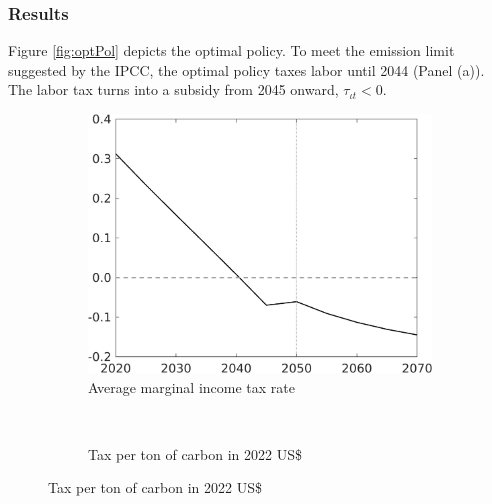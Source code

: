 \subsubsection{Results}\label{sec:optres}
Figure \ref{fig:optPol} depicts the optimal policy.
To meet the emission limit suggested by the IPCC, the optimal policy taxes labor until 2044 (Panel (a)). The labor tax  turns into a subsidy from 2045 onward, $\tau_{\iota t}<0$. 
\begin{figure}[h!!]
	\centering
	\caption{Optimal policy }\label{fig:optPol}
	\begin{subfigure}{0.4\textwidth}
		\caption{Average marginal income tax rate }
		\includegraphics[width=1\textwidth]{../../codding_model/own_basedOnFried/optimalPol_010922_revision/figures/all_13Sept22_Tplus30/dTaulAv_OPT_T_NoTaus_COMPtaul_regime4_spillover0_knspil0_noskill0_sep0_xgrowth0_PV1_etaa0.79_lgd0.png}
	\end{subfigure}
\begin{minipage}[]{0.1\textwidth}
	\
\end{minipage}
	\begin{subfigure}{0.4\textwidth}
		\caption{Tax per ton of carbon in 2022 US\$ }

\end{subfigure}
\end{figure}
